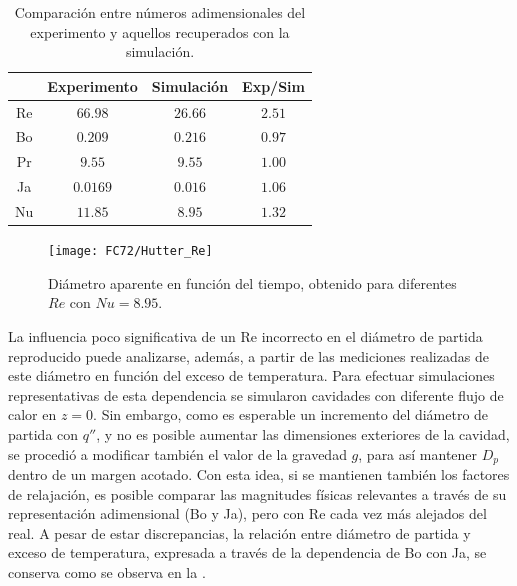 \begin{table}[ht]
	\centering
    \begin{tabular}{c c c c}
	    \toprule
         & \bf Experimento & \bf Simulaci\'on & \bf Exp/Sim\\
        \midrule
		Re & $66.98$  & $26.66$ & $2.51$ \\
		Bo & $0.209$  & $0.216$ & $0.97$ \\
		Pr & $9.55$   & $9.55$  & $1.00$ \\
		Ja & $0.0169$ & $0.016$ & $1.06$  \\
		Nu & $11.85$  & $8.95$  & $$1.32$$ \\		
        \bottomrule
	\end{tabular}
	\caption{Comparaci\'on entre n\'umeros adimensionales del experimento y aquellos recuperados con la simulaci\'on.}
	\label{tab:adim_reproducidos}
\end{table} 

\begin{figure}[ht]
	\centering
	\texttt{[image: FC72/Hutter\_Re]}
	\caption{Di\'ametro aparente en funci\'on del tiempo, obtenido para diferentes $Re$ con $Nu=8.95$.}
	\label{fig:d_vs_t_Re}
\end{figure}
\FloatBarrier

La influencia poco significativa de un Re incorrecto en el di\'ametro de partida reproducido puede analizarse, adem\'as, a partir de las mediciones realizadas de este di\'ametro en funci\'on del exceso de temperatura. Para efectuar simulaciones representativas de esta dependencia se simularon cavidades con diferente flujo de calor en $z=0$. Sin embargo, como es esperable un incremento del di\'ametro de partida con $q''$, y no es posible aumentar las dimensiones exteriores de la cavidad, se procedi\'o a modificar tambi\'en el valor de la gravedad $g$, para as\'i mantener $D_p$ dentro de un margen acotado. Con esta idea, si se mantienen tambi\'en los factores de relajaci\'on, es posible comparar las magnitudes f\'isicas relevantes a trav\'es de su representaci\'on adimensional (Bo y Ja), pero con Re cada vez m\'as alejados del real. A pesar de estar discrepancias, la  relaci\'on entre di\'ametro de partida y exceso de temperatura, expresada a trav\'es de la dependencia de Bo con Ja, se conserva como se observa en la .

